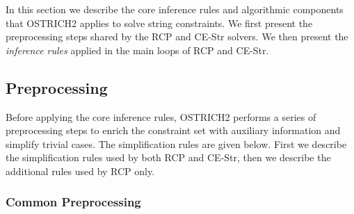 
In this section we describe the core inference rules and algorithmic components that OSTRICH2 applies to solve string constraints.
We first present the preprocessing steps shared by the RCP and CE-Str solvers.
We then present the \emph{inference rules} applied in the main loops of RCP and CE-Str.

\subsection{Preprocessing}

Before applying the core inference rules, OSTRICH2 performs a series of preprocessing steps to enrich the constraint set with auxiliary information and simplify trivial cases.
The simplification rules are given below.
First we describe the simplification rules used by both RCP and CE-Str, then we describe the additional rules used by RCP only.

\subsubsection{Common Preprocessing}

